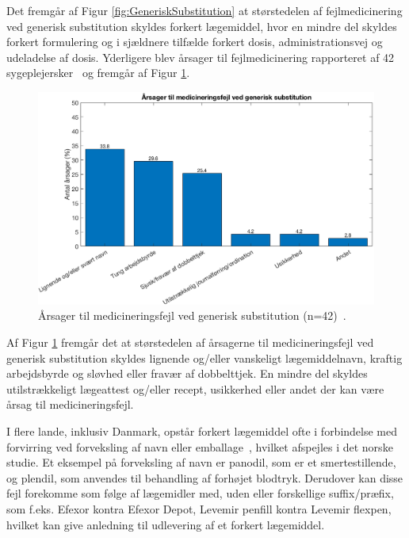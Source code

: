 Det fremgår af Figur \ref{fig:GeneriskSubstitution} at størstedelen af fejlmedicinering ved generisk substitution skyldes forkert lægemiddel, hvor en mindre del skyldes forkert formulering og i sjældnere tilfælde forkert dosis, administrationsvej og udeladelse af dosis. Yderligere blev årsager til fejlmedicinering rapporteret af 42 sygeplejersker~\citep{Hakonsen2010} og fremgår af Figur \ref{fig:GeneriskSubstitution1}.

\begin{figure}[H]\centering	\includegraphics[width=1\textwidth]{billeder/GenSub1.png} 
	\caption{Årsager til medicineringsfejl ved generisk substitution (n=42)~\citep{Hakonsen2010}.}	\label{fig:GeneriskSubstitution1}  
\end{figure}

Af Figur \ref{fig:GeneriskSubstitution1} fremgår det at størstedelen af årsagerne til medicineringsfejl ved generisk substitution skyldes lignende og/eller vanskeligt lægemiddelnavn, kraftig arbejdsbyrde og sløvhed eller fravær af dobbelttjek. En mindre del skyldes utilstrækkeligt lægeattest og/eller recept, usikkerhed eller andet der kan være årsag til medicineringsfejl. 

I flere lande, inklusiv Danmark, opstår forkert lægemiddel ofte i forbindelse med forvirring ved  forveksling af navn eller emballage~\citep{DanskSelskabforPatientsikkerhed2009}, hvilket afspejles i det norske studie. Et eksempel på forveksling af navn er panodil, som er et smertestillende, og plendil, som anvendes til behandling af forhøjet blodtryk. Derudover kan disse fejl forekomme som følge af lægemidler med, uden eller forskellige suffix/præfix, som f.eks. Efexor kontra Efexor Depot, Levemir penfill kontra Levemir flexpen, hvilket kan give anledning til udlevering af et forkert lægemiddel.~\citep{DanskSelskabforPatientsikkerhed2009}

